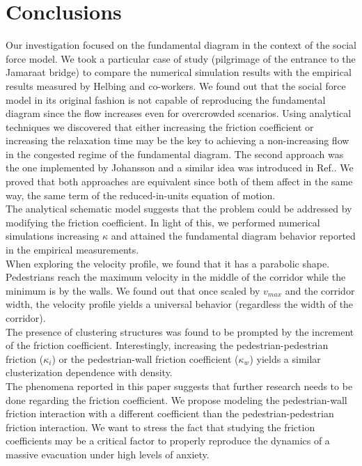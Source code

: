 \section{\label{conclusions}Conclusions}

Our investigation focused on the fundamental diagram in the context of the social force model. We took a particular case of study (pilgrimage of the entrance to the Jamaraat bridge) to compare the numerical simulation results with the empirical results measured by Helbing and co-workers. We found out that the  social force model in its original fashion is not capable of reproducing the fundamental diagram since the flow increases even for overcrowded scenarios. Using analytical techniques we discovered that either increasing the friction coefficient or increasing the relaxation time may be the key to achieving a non-increasing flow in the congested regime of the fundamental diagram. The second approach was the one implemented by Johansson and a similar idea was introduced in Ref.\cite{parisi2}. We proved that both approaches are equivalent since both of them affect in the same way, the same term of the reduced-in-units equation of motion.\\

The analytical schematic model suggests that the problem could be addressed by modifying the friction coefficient. In light of this, we performed numerical simulations increasing $\kappa$ and attained the fundamental diagram behavior reported in the empirical measurements. \\

When exploring the velocity profile, we found that it has a parabolic shape. Pedestrians reach the maximum velocity in the middle of the corridor while the minimum is by the walls. We found out that once scaled by $v_{max}$ and the corridor width, the velocity profile yields a universal behavior (regardless the width of the corridor).\\

The presence of clustering structures was found to be prompted by the increment of the friction coefficient. Interestingly, increasing the pedestrian-pedestrian friction ($\kappa_i$) or the pedestrian-wall friction coefficient ($\kappa_w$) yields a similar clusterization dependence with density.\\

The phenomena reported in this paper suggests that further research needs to be done regarding the friction coefficient. We propose modeling the pedestrian-wall friction interaction with a different coefficient than the pedestrian-pedestrian friction interaction. We want to stress the fact that studying the friction coefficients may be a critical factor to properly reproduce the dynamics of a massive evacuation under high levels of anxiety. 



